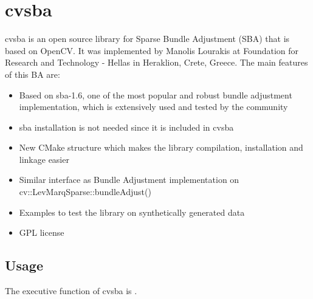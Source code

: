 \section{cvsba}
cvsba is an open source library for Sparse Bundle Adjustment (SBA) that is based on OpenCV. It was implemented by Manolis Lourakis at Foundation for Research and Technology - Hellas in Heraklion, Crete, Greece. The main features of this BA are:
\begin{itemize}
\item Based on sba-1.6, one of the most popular and robust bundle adjustment implementation, which is extensively used and tested by the community
\item sba installation is not needed since it is included in cvsba
\item New CMake structure which makes the library compilation, installation and linkage easier
\item Similar interface as Bundle Adjustment implementation on cv::LevMarqSparse::bundleAdjust()
\item Examples to test the library on synthetically generated data
\item GPL license
\end{itemize}

\subsection{Usage}
The executive function of cvsba is . 

